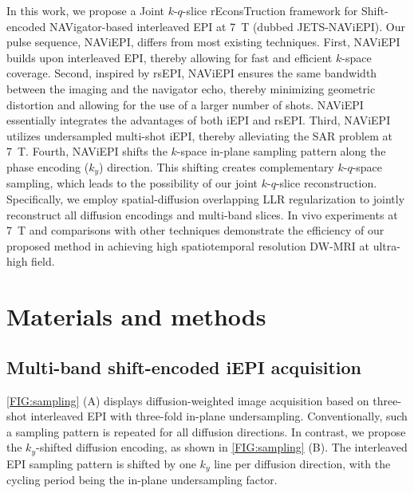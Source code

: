\documentclass[preprint,12pt,authoryear,review]{elsarticle}
\begin{document}
    In this work, we propose a Joint $k$-$q$-slice rEconsTruction framework
    for Shift-encoded NAVigator-based interleaved EPI
    at \SI{7}{\tesla} (dubbed JETS-NAViEPI).
    Our pulse sequence, NAViEPI, differs from most existing techniques.
    First, NAViEPI builds upon interleaved EPI, thereby allowing for
    fast and efficient $k$-space coverage.
    Second, inspired by rsEPI, NAViEPI ensures the same bandwidth
    between the imaging and the navigator echo,
    thereby minimizing geometric distortion and
    allowing for the use of a larger number of shots.
    NAViEPI essentially integrates the advantages of both iEPI and rsEPI.
    Third, NAViEPI utilizes undersampled multi-shot iEPI,
    thereby alleviating the SAR problem at \SI{7}{\tesla}.
    Fourth, NAViEPI shifts the $k$-space in-plane sampling pattern
    along the phase encoding ($k_y$) direction.
    This shifting creates complementary $k$-$q$-space sampling,
    which leads to the possibility of
    our joint $k$-$q$-slice reconstruction.
    Specifically, we employ spatial-diffusion overlapping LLR regularization
    to jointly reconstruct all diffusion encodings and multi-band slices.
    In vivo experiments at \SI{7}{\tesla} and
    comparisons with other techniques
    demonstrate the efficiency of our proposed method in
    achieving high spatiotemporal resolution DW-MRI at ultra-high field.

    \clearpage

    \section{Materials and methods}
    \label{SEC:Meth}

    \subsection{Multi-band shift-encoded iEPI acquisition}

    \cref{FIG:sampling} (A) displays diffusion-weighted image acquisition
    based on three-shot interleaved EPI
    with three-fold in-plane undersampling.
    Conventionally, such a sampling pattern is repeated
    for all diffusion directions.
    In contrast, we propose the $k_y$-shifted diffusion encoding,
    as shown in \cref{FIG:sampling} (B).
    The interleaved EPI sampling pattern is shifted by one $k_y$ line
    per diffusion direction,
    with the cycling period being the in-plane undersampling factor.
\end{document}

